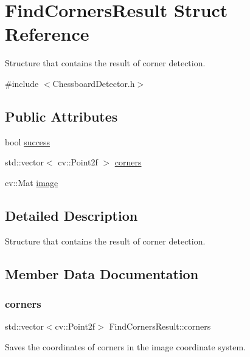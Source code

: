 \hypertarget{structFindCornersResult}{}\section{Find\+Corners\+Result Struct Reference}
\label{structFindCornersResult}


Structure that contains the result of corner detection.  




{\ttfamily \#include $<$Chessboard\+Detector.\+h$>$}

\subsection*{Public Attributes}
\begin{DoxyCompactItemize}
\item 
bool \hyperlink{structFindCornersResult_a53a6b5d4fc0243582800d92b2bc5e706}{success}
\item 
std\+::vector$<$ cv\+::\+Point2f $>$ \hyperlink{structFindCornersResult_a138337b67fb9eb6010ec7c9a276a009f}{corners}
\item 
cv\+::\+Mat \hyperlink{structFindCornersResult_a8c2fd90c9f86bed108eb777fd237f113}{image}
\end{DoxyCompactItemize}


\subsection{Detailed Description}
Structure that contains the result of corner detection. 

\subsection{Member Data Documentation}
\mbox{\label{structFindCornersResult_a138337b67fb9eb6010ec7c9a276a009f}} 
\subsubsection{\texorpdfstring{corners}{corners}}
{\footnotesize\ttfamily std\+::vector$<$cv\+::\+Point2f$>$ Find\+Corners\+Result\+::corners}

Saves the coordinates of corners in the image coordinate system. 

